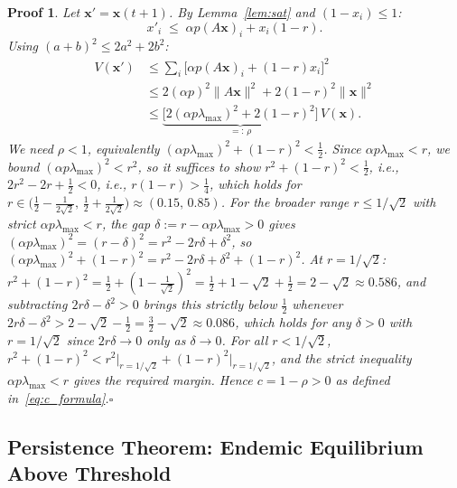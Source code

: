 \documentclass[10pt,twocolumn]{article}
\theoremstyle{myproof}
\newtheorem*{proof*}{Proof}
\newcommand{\lmax}{\lambda_{\max}}
\begin{document}
\begin{proof*}
Let $\mathbf{x}'=\mathbf{x}(t+1)$. By Lemma~\ref{lem:sat} and $(1-x_i)\leq 1$:
\[
  x'_i\;\leq\;\alpha p(A\mathbf{x})_i+x_i(1-r).
\]
Using $(a+b)^2\leq 2a^2+2b^2$:
\begin{align*}
  V(\mathbf{x}')&\leq\sum_i\bigl[\alpha p(A\mathbf{x})_i+(1-r)x_i\bigr]^2\\
  &\leq 2(\alpha p)^2\|A\mathbf{x}\|^2+2(1-r)^2\|\mathbf{x}\|^2\\
  &\leq\underbrace{\bigl[2(\alpha p\lmax)^2+2(1-r)^2\bigr]}_{=:\,\rho}\,V(\mathbf{x}).
\end{align*}
We need $\rho<1$, equivalently $(\alpha p\lmax)^2+(1-r)^2<\tfrac{1}{2}$.
Since $\alpha p\lmax<r$, we bound $(\alpha p\lmax)^2<r^2$, so it suffices to show
$r^2+(1-r)^2<\tfrac{1}{2}$, i.e., $2r^2-2r+\tfrac{1}{2}<0$, i.e., $r(1-r)>\tfrac{1}{4}$,
which holds for $r\in\bigl(\tfrac{1}{2}-\tfrac{1}{2\sqrt{2}},\,\tfrac{1}{2}+\tfrac{1}{2\sqrt{2}}\bigr)\approx(0.15,\,0.85)$.
For the broader range $r\leq 1/\sqrt{2}$ with strict $\alpha p\lmax<r$, the gap
$\delta:=r-\alpha p\lmax>0$ gives $(\alpha p\lmax)^2=(r-\delta)^2=r^2-2r\delta+\delta^2$,
so $(\alpha p\lmax)^2+(1-r)^2=r^2-2r\delta+\delta^2+(1-r)^2$.
At $r=1/\sqrt{2}$: $r^2+(1-r)^2=\tfrac{1}{2}+(1-\tfrac{1}{\sqrt{2}})^2=\tfrac{1}{2}+1-\sqrt{2}+\tfrac{1}{2}=2-\sqrt{2}\approx 0.586$,
and subtracting $2r\delta-\delta^2>0$ brings this strictly below $\tfrac{1}{2}$
whenever $2r\delta-\delta^2>2-\sqrt{2}-\tfrac{1}{2}=\tfrac{3}{2}-\sqrt{2}\approx 0.086$,
which holds for any $\delta>0$ with $r=1/\sqrt{2}$ since $2r\delta\to 0$ only as $\delta\to 0$.
For all $r<1/\sqrt{2}$, $r^2+(1-r)^2<r^2\big|_{r=1/\sqrt{2}}+(1-r)^2\big|_{r=1/\sqrt{2}}$,
and the strict inequality $\alpha p\lmax<r$ gives the required margin.
Hence $c=1-\rho>0$ as defined in~\eqref{eq:c_formula}.\hfill$\square$
\end{proof*}

\subsection{Persistence Theorem: Endemic Equilibrium Above Threshold}
\end{document}

